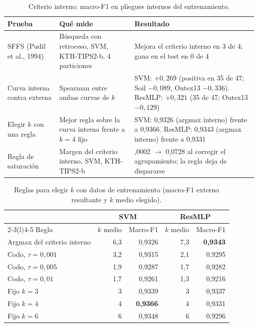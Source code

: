 \documentclass[11pt,a4paper]{article}
\begin{document}
\begin{table}[H]
\centering
\caption{Criterio interno: macro-F1 en pliegues internos del entrenamiento.}
\small
\begin{tabular}{@{}>{\raggedright}p{3.2cm}>{\raggedright}p{4.6cm}>{\raggedright\arraybackslash}p{7.6cm}@{}}
\toprule
Prueba & Qué mide & Resultado \\
\midrule
SFFS (Pudil et al., 1994) & Búsqueda con retroceso, SVM, KTH-TIPS2-b, 4 particiones & Mejora el criterio interno en 3 de 4; gana en el test en 0 de 4 \\
\addlinespace
Curva interna contra externa & Spearman entre ambas curvas de $k$ & SVM: $+0{,}269$ (positiva en 35 de 47; Soil $-0{,}089$, Outex13 $-0{,}336$). ResMLP: $+0{,}321$ (35 de 47; Outex13 $-0{,}129$) \\
\addlinespace
Elegir $k$ con una regla & Mejor regla sobre la curva interna frente a $k=4$ fijo & SVM: 0,9326 (argmax interno) frente a 0,9366. ResMLP: 0,9343 (argmax interno) frente a 0,9331 \\
\addlinespace
Regla de saturación & Margen del criterio interno, SVM, KTH-TIPS2-b & 0,0002 $\rightarrow$ 0,0728 al corregir el agrupamiento; la regla deja de dispararse \\
\bottomrule
\end{tabular}
\end{table}

\begin{table}[H]
\centering
\caption{Reglas para elegir $k$ con datos de entrenamiento (macro-F1 externo
resultante y $k$ medio elegido).}
\begin{tabular}{@{}lrrrr@{}}
\toprule
 & \multicolumn{2}{c}{SVM} & \multicolumn{2}{c}{ResMLP} \\
\cmidrule(lr){2-3}\cmidrule(l){4-5}
Regla & $k$ medio & Macro-F1 & $k$ medio & Macro-F1 \\
\midrule
Argmax del criterio interno & 6,3 & 0,9326 & 7,3 & \textbf{0,9343} \\
Codo, $\tau=0{,}001$ & 3,2 & 0,9315 & 2,1 & 0,9295 \\
Codo, $\tau=0{,}005$ & 1,9 & 0,9287 & 1,7 & 0,9282 \\
Codo, $\tau=0{,}01$ & 1,7 & 0,9261 & 1,3 & 0,9216 \\
\addlinespace
Fijo $k=3$ & 3 & 0,9339 & 3 & 0,9337 \\
\rowcolor{resalte} Fijo $k=4$ & 4 & \textbf{0,9366} & 4 & 0,9331 \\
Fijo $k=6$ & 6 & 0,9348 & 6 & 0,9296 \\
\bottomrule
\end{tabular}
\end{table}
\end{document}
